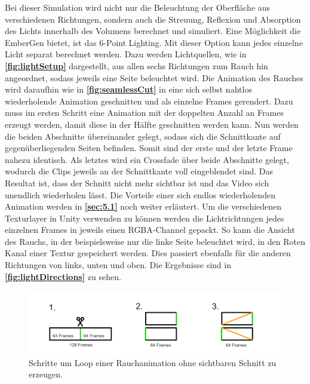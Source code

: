 Bei dieser Simulation wird nicht nur die Beleuchtung der Oberfläche aus verschiedenen Richtungen, sondern auch die Streuung, Reflexion und Absorption des Lichts innerhalb
des Volumens berechnet und simuliert.
Eine Möglichkeit die EmberGen bietet, ist das 6-Point Lighting.
Mit dieser Option kann jedes einzelne Licht separat berechnet werden. Dazu werden Lichtquellen, wie in \textbf{\autoref{fig:lightSetup}} dargestellt, aus allen sechs Richtungen zum Rauch hin angeordnet,
sodass jeweils eine Seite beleuchtet wird.
Die Animation des Rauches wird daraufhin wie in \textbf{\autoref{fig:seamlessCut}} in eine sich selbst nahtlos wiederholende Animation
geschnitten und als einzelne Frames gerendert. Dazu muss im ersten Schritt eine Animation mit der doppelten Anzahl an Frames erzeugt werden, damit diese in der Hälfte
geschnitten werden kann. Nun werden die beiden Abschnitte übereinander gelegt, sodass sich die Schnittkante auf gegenüberliegenden Seiten befinden. Somit sind der erste
und der letzte Frame nahezu identisch. Als letztes wird ein Crossfade über beide Abschnitte gelegt, wodurch die Clips jeweils an der Schnittkante voll eingeblendet
sind. Das Resultat ist, dass der Schnitt nicht mehr sichtbar ist und das Video sich unendlich wiederholen lässt. Die Vorteile einer sich endlos wiederholenden Animation werden in \textbf{\autoref{sec:5.1}}
noch weiter erläutert.
Um die verschiedenen Texturlayer in Unity verwenden zu können werden die Lichtrichtungen jedes einzelnen Frames in jeweils einen RGBA-Channel gepackt.
So kann die Ansicht des Rauchs, in der beispielsweise nur die linke Seite beleuchtet wird, in den Roten Kanal einer Textur gespeichert werden.
Dies passiert ebenfalls für die anderen Richtungen von links, unten und oben. Die Ergebnisse sind in \textbf{\autoref{fig:lightDirections}} zu sehen.



\begin{figure}[h!]
	\includegraphics[width=\textwidth]{Grafiken/Implementation/Lightmaps/SeamlessCut.png}
	\centering
	\begin{footnotesize}
		\caption{Schritte um Loop einer Rauchanimation ohne sichtbaren Schnitt zu erzeugen. }
		\label{fig:seamlessCut}
	\end{footnotesize}
\end{figure}


